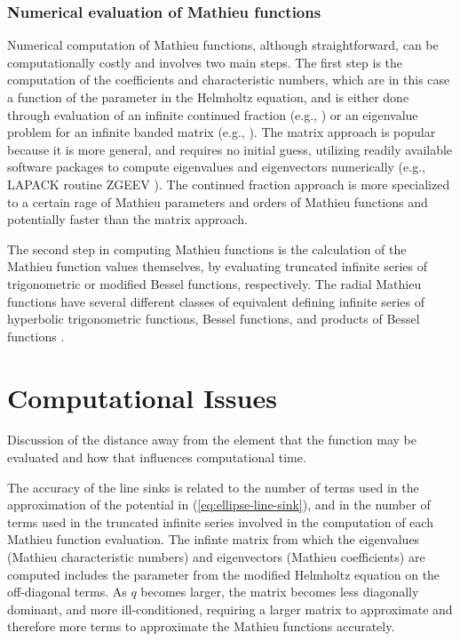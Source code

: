 \documentclass{elsart}
\begin{document}
\subsubsection{Numerical evaluation of Mathieu functions}
Numerical computation of Mathieu functions, although straightforward, can be computationally costly and involves two main steps.  The first step is the computation of the coefficients and characteristic numbers, which are in this case a function of the parameter in the Helmholtz equation, and is either done through evaluation of an infinite continued fraction (e.g., \cite{blanch1966numerical,alhargan2000}) or an eigenvalue problem for an infinite banded matrix (e.g., \cite{delft73,stamnes1995new}). The matrix approach is popular because it is more general, and requires no initial guess, utilizing readily available software packages to compute eigenvalues and eigenvectors numerically (e.g., LAPACK routine ZGEEV \cite{anderson1999}).  The continued fraction approach is more specialized to a certain rage of Mathieu parameters and orders of Mathieu functions and potentially faster than the matrix approach.

The second step in computing Mathieu functions is the calculation of the Mathieu function values themselves, by evaluating truncated infinite series of trigonometric or modified Bessel functions, respectively.  The radial Mathieu functions have several different classes of equivalent defining infinite series of hyperbolic trigonometric functions, Bessel functions, and products of Bessel functions \cite{mclachlan47,nist28wolf}.

\section{Computational Issues}
Discussion of the distance away from the element that the function may be evaluated and how that influences computational time. 

The accuracy of the line sinks is related to the number of terms used in the approximation of the potential in (\ref{eq:ellipse-line-sink}), and in the number of terms used in the truncated infinite series involved in the computation of each Mathieu function evaluation.  The infinte matrix from which the eigenvalues (Mathieu characteristic numbers) and eigenvectors (Mathieu coefficients) are computed includes the parameter from the modified Helmholtz equation on the off-diagonal terms.  As $q$ becomes larger, the matrix becomes less diagonally dominant, and more ill-conditioned, requiring a larger matrix to approximate and therefore more terms to approximate the Mathieu functions accurately.  
\end{document}
